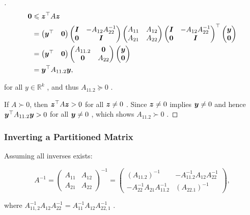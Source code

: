 \begin{proof}[]
\[
	\begin{split} \boldsymbol{0} &\leqslant \boldsymbol{z}^{\top} A \boldsymbol{z} \\ &= \begin{pmatrix} \boldsymbol{y}^{\top} & \boldsymbol{0} \end{pmatrix} \begin{pmatrix} \boldsymbol{I} & -A_{12} A_{22}^{-1} \\ \boldsymbol{0} & \boldsymbol{I} \end{pmatrix} \begin{pmatrix} A_{11} & A_{12} \\ A_{21} & A_{22} \end{pmatrix} \begin{pmatrix} \boldsymbol{I} & -A_{12} A_{22}^{-1} \\ \boldsymbol{0} & \boldsymbol{I} \end{pmatrix}^{\top} \begin{pmatrix} \boldsymbol{y} \\ \boldsymbol{0} \end{pmatrix} \\ &= \begin{pmatrix} \boldsymbol{y}^{\top} & \boldsymbol{0} \end{pmatrix} \begin{pmatrix} A_{11.2} & \boldsymbol{0} \\ \boldsymbol{0} & A_{22} \end{pmatrix} \begin{pmatrix} \boldsymbol{y} \\ \boldsymbol{0} \end{pmatrix} \\ &= \boldsymbol{y}^{\top} A_{11.2} \boldsymbol{y}, \end{split}
\]

for all \(y \in \mathbb{R}^k\) , and thus \(A_{11.2} \succeq 0\) .

If \(A \succ 0\), then \(\boldsymbol{z}^{\top} A \boldsymbol{z} > 0\) for
all \(\boldsymbol{z} \neq 0\) . Since \(\boldsymbol{z} \neq 0\) implies
\(\boldsymbol{y} \neq 0\) and hence
\(\boldsymbol{y}^{\top} A_{11.2} \boldsymbol{y} > 0\) for all
\(\boldsymbol{y} \neq 0\) , which shows \(A_{11.2} \succ 0\) .
\end{proof}


\subsubsection{Inverting a Partitioned Matrix}%
\label{ssub:ipm}

\begin{lemma}
Assuming all inverses exists:

\[A^{-1} = \begin{pmatrix} A_{11} & A_{12} \\ A_{21} & A_{22} \end{pmatrix}^{-1} = \begin{pmatrix} (A_{11.2})^{-1} & -A_{11.2}^{-1}A_{12}A_{22}^{-1} \\ -A_{22}^{-1}A_{21}A_{11.2}^{-1} & (A_{22.1})^{-1} \end{pmatrix},\]

where
\(A_{11,2}^{-1}A_{12}A_{22}^{-1} = A_{11}^{-1}A_{12}A_{22,1}^{-1}\) .
\end{lemma}

